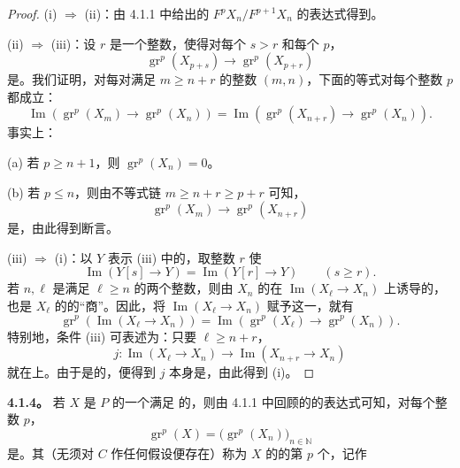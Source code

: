 \begin{proof}(i) $\Rightarrow$ (ii)：由 4.1.1 中给出的 $F^pX_n/F^{p+1}X_n$ 的表达式得到。

(ii) $\Rightarrow$ (iii)：设 $r$ 是一个整数，使得对每个 $s>r$ 和每个 $p$，
\[
\operatorname{gr}^p(X_{p+s})\longrightarrow\operatorname{gr}^p(X_{p+r})
\]
是。我们证明，对每对满足 $m\geq n+r$ 的整数 $(m,n)$，下面的等式对每个整数 $p$ 都成立：
\[
\operatorname{Im}(\operatorname{gr}^p(X_m)\to\operatorname{gr}^p(X_n))=\operatorname{Im}(\operatorname{gr}^p(X_{n+r})\to\operatorname{gr}^p(X_n)).
\]
事实上：

(a) 若 $p\geq n+1$，则 $\operatorname{gr}^p(X_n)=0$。

(b) 若 $p\leq n$，则由不等式链 $m\geq n+r\geq p+r$ 可知，
\[
\operatorname{gr}^p(X_m)\longrightarrow\operatorname{gr}^p(X_{n+r})
\]
是，由此得到断言。

(iii) $\Rightarrow$ (i)：以 $Y$ 表示 (iii) 中的，取整数 $r$ 使
\[
\operatorname{Im}(Y[s]\to Y)=\operatorname{Im}(Y[r]\to Y)\qquad(s\geq r).
\]
若 $n,\ell$ 是满足 $\ell\geq n$ 的两个整数，则由 $X_n$ 的在 $\operatorname{Im}(X_\ell\to X_n)$ 上诱导的，也是 $X_\ell$ 的的“商”。因此，将 $\operatorname{Im}(X_\ell\to X_n)$ 赋予这一，就有
\[
\operatorname{gr}^p(\operatorname{Im}(X_\ell\to X_n))=\operatorname{Im}(\operatorname{gr}^p(X_\ell)\to\operatorname{gr}^p(X_n)).
\]
特别地，条件 (iii) 可表述为：只要 $\ell\geq n+r$，
\[
j:\operatorname{Im}(X_\ell\to X_n)\longrightarrow\operatorname{Im}(X_{n+r}\to X_n)
\]
就在上。由于是的，便得到 $j$ 本身是，由此得到 (i)。
\end{proof}
\textbf{4.1.4。} 若 $X$ 是 $P$ 的一个满足  的，则由 4.1.1 中回顾的的表达式可知，对每个整数 $p$，
\[
\operatorname{gr}^p(X)=\bigl(\operatorname{gr}^p(X_n)\bigr)_{n\in\mathbb N}
\]
是。其（无须对 $C$ 作任何假设便存在）称为 $X$ 的的第 $p$ 个，记作
